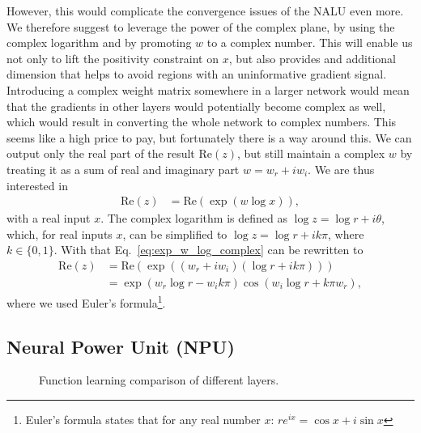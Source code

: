 \documentclass[9pt]{article}
\newcommand{\real}{\text{Re}}
\newcommand{\wre}{w_{r}}
\newcommand{\wim}{w_{i}}
\begin{document}
However, this would complicate the convergence issues of the NALU even more.
We therefore suggest to leverage the power of the complex plane, by using the
complex logarithm and by promoting $w$ to a complex number.  This will enable
us not only to lift the positivity constraint on $x$, but also provides and
additional dimension that helps to avoid regions with an uninformative gradient
signal.  Introducing a complex
weight matrix somewhere in a larger network would mean that the gradients in
other layers would potentially become complex as well, which would result in
converting the whole network to complex numbers.  This seems like a high price
to pay, but fortunately there is a way around this.  We can output only the
real part of the result $\real(z)$, but still maintain a complex $w$ by
treating it as a sum of real and imaginary part $w=\wre+i\wim$. We are thus
interested in
\begin{align}
  \label{eq:exp_w_log_complex}
  \real(z) &= \real(\exp(w\log x)),
\end{align}
with a real input $x$. The complex logarithm is defined as $\log z=\log r +
i\theta$, which, for real inputs $x$, can be simplified to $\log z = \log r +
ik\pi$, where $k\in \{0,1\}$. With that Eq.~\ref{eq:exp_w_log_complex} can be
rewritten to
\begin{align}
  \real(z) &= \real(\exp((\wre + i\wim) (\log r + ik\pi))) \\
    &= \exp(\wre\log r - \wim k\pi) \cos(\wim\log r + k\pi\wre),
\end{align}
where we used Euler's formula\footnote{Euler's formula states that for any real
number $x$: $re^{ix} = \cos x + i\sin x$}.

\subsection{Neural Power Unit (NPU)}%
\label{sub:neural_power_unit_npu_}

\begin{figure}
  \centering
  \resizebox{.3\textwidth}{!}{}
  \resizebox{.3\textwidth}{!}{}
  \resizebox{.3\textwidth}{!}{}
  \caption{Function learning comparison of different layers.}%
  \label{fig:sin_comp}
\end{figure}
\end{document}

